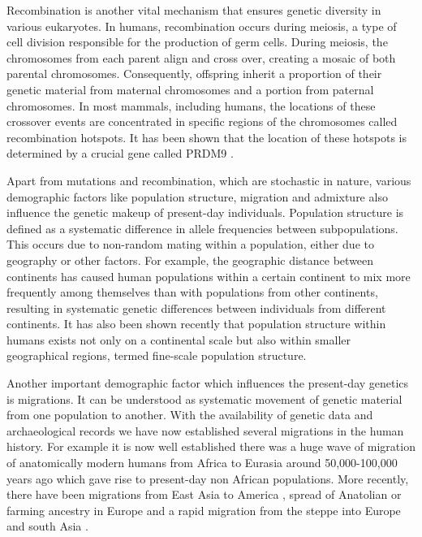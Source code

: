 Recombination is another vital mechanism that ensures genetic diversity in various eukaryotes. In humans, recombination occurs during meiosis, a type of cell division responsible for the production of germ cells. During meiosis, the chromosomes from each parent align and cross over, creating a mosaic of both parental chromosomes. Consequently, offspring inherit a proportion of their genetic material from maternal chromosomes and a portion from paternal chromosomes. In most mammals, including humans, the locations of these crossover events are concentrated in specific regions of the chromosomes called recombination hotspots. It has been shown that the location of these hotspots is determined by a crucial gene called PRDM9 \cite{Baudat2010}.

Apart from mutations and recombination, which are stochastic in nature, various demographic factors like population structure, migration and admixture also influence the genetic makeup of present-day individuals. Population structure is defined as a systematic difference in allele frequencies between subpopulations. This occurs due to non-random mating within a population, either due to geography or other factors. For example, the geographic distance between continents has caused human populations within a certain continent to mix more frequently among themselves than with populations from other continents, resulting in systematic genetic differences between individuals from different continents. It has also been shown recently that population structure within humans exists not only on a continental scale but also within smaller geographical regions, termed fine-scale population structure.

Another important demographic factor which influences the present-day genetics is migrations. It can be understood as systematic movement of genetic material from one population to another. With the availability of genetic data and archaeological records we have now established several migrations in the human history. For example it is now well established there was a huge wave of migration of anatomically modern humans from Africa to Eurasia around 50,000-100,000 years ago which gave rise to present-day non African populations. More recently, there have been migrations from East Asia to America \cite{reich2012reconstructing}, spread of Anatolian or farming ancestry in Europe \cite{lazaridis2014ancient} and a rapid migration from the steppe into Europe and south Asia \cite{haak2015massive}.

